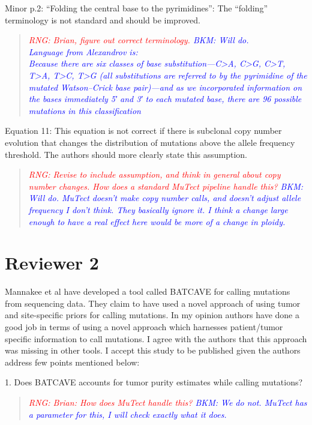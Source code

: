 \documentclass[11pt]{article}
\newcommand{\BKM}[1]{\textcolor{blue}{BKM: #1}}
\newcommand{\RNG}[1]{\textcolor{red}{RNG: #1}}
\newenvironment{response}
{\begin{quote}\itshape}
{\end{quote}}
\begin{document}
Minor
p.2: “Folding the central base to the pyrimidines”: The “folding” terminology is not standard and should be improved. 
\begin{response}
\RNG{Brian, figure out correct terminology.}
\BKM{Will do.\\Language from Alexandrov is:\\Because there are six classes of base substitution—C>A, C>G, C>T, T>A, T>C, T>G (all substitutions are referred to by the pyrimidine of the mutated Watson–Crick base pair)—and as we incorporated information on the bases immediately 5′ and 3′ to each mutated base, there are 96 possible mutations in this classification}
\end{response}

Equation 11: This equation is not correct if there is subclonal copy number evolution that changes the distribution of mutations above the allele frequency threshold. The authors should more clearly state this assumption.
\begin{response}
\RNG{Revise to include assumption, and think in general about copy number changes. How does a standard MuTect pipeline handle this?}
\BKM{Will do. MuTect doesn't make copy number calls, and doesn't adjust allele frequency I don't think. They basically ignore it. I think a change large enough to have a real effect here would be more of a change in ploidy.}
\end{response}

\section*{Reviewer 2}

Mannakee et al have developed a tool called BATCAVE for calling mutations from sequencing data. They claim to have used a novel approach of using tumor and site-specific priors for calling mutations. In my opinion authors have done a good job in terms of using a novel approach which harnesses patient/tumor specific information to call mutations. I agree with the authors that this approach was missing in other tools. I accept this study to be published given the authors address few points mentioned below:

1. Does BATCAVE accounts for tumor purity estimates while calling mutations?
\begin{response}
\RNG{Brian: How does MuTect handle this?}
\BKM{We do not. MuTect has a parameter for this, I will check exactly what it does.}
\end{response}
\end{document}

